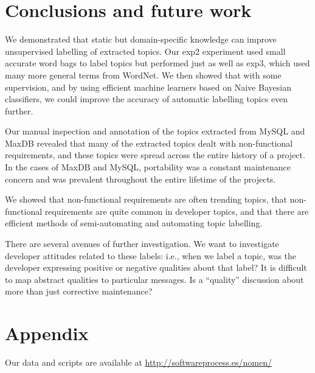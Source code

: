 \documentclass[]{sig-alternate}
\begin{document}
\section{Conclusions and future work}

We demonstrated that static but domain-specific knowledge can improve unsupervised labelling of extracted topics. Our \textsf{exp2} experiment used small accurate word bags to label topics but performed just as well as \textsf{exp3}, which used many more general terms from WordNet. We then showed that with some supervision, and by using efficient machine learners based on Naive Bayesian classifiers, we could improve the accuracy of automatic labelling topics even further.

Our manual inspection and annotation of the topics extracted from MySQL and MaxDB revealed that many of the extracted topics dealt with non-functional requirements, and these topics were spread across the entire history of a project. In the cases of MaxDB and MySQL, portability was a constant maintenance concern and was prevalent throughout the entire lifetime of the projects.

We showed that non-functional requirements are often trending topics, that non-functional requirements are quite common in developer topics, and that there are efficient methods of semi-automating and automating topic labelling.

There are several avenues of further investigation.  We want to investigate developer attitudes related to these labels: i.e., when we label a topic, was the developer expressing positive or negative qualities about that label?  It is difficult to map abstract qualities to particular messages. Is a ``quality'' discussion about more than just corrective maintenance? %

\section{Appendix}
Our data and scripts are available at \url{http://softwareprocess.es/nomen/}


%

\end{document}
